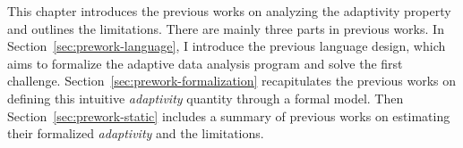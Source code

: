 This chapter introduces the previous works on analyzing the adaptivity property and outlines the limitations.
There are mainly three parts in previous works.
In Section~\ref{sec:prework-language}, I introduce the previous language design, which aims to formalize
the adaptive data analysis program and solve the first challenge.
Section~\ref{sec:prework-formalization} recapitulates the previous works
on defining this intuitive \emph{adaptivity} quantity through a formal model.
Then Section~\ref{sec:prework-static} includes a summary of previous works on estimating
their formalized \emph{adaptivity} and the limitations.


